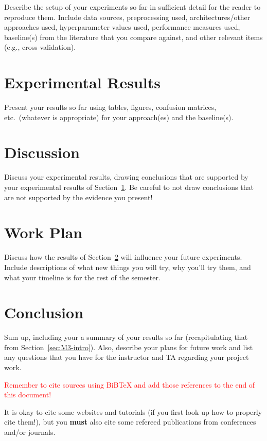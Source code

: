 \documentclass{report}
\begin{document}
Describe the setup of your experiments so far in sufficient detail for the reader to reproduce them.  Include data sources, preprocessing used, architectures/other approaches used, hyperparameter values used, performance measures used, baseline(s) from the literature that you compare against, and other relevant items (e.g., cross-validation).

\section{Experimental Results}
\label{sec:M3-results}

Present your results so far using tables, figures, confusion matrices, etc.\ (whatever is appropriate) for  your approach(es) and the baseline(s). 

\section{Discussion}
\label{sec:M3-discussion}

Discuss your experimental results, drawing conclusions that are supported by your experimental results of Section~\ref{sec:M3-results}.  Be careful to not draw conclusions that are not supported by the evidence you present! 


\section{Work Plan}

Discuss how the results of Section~\ref{sec:M3-discussion} will influence your future experiments.  Include descriptions of what new things you will try, why you'll try them, and what your timeline is for the rest of the semester. 

\section{Conclusion}

Sum up, including your a summary of your results so far (recapitulating that from Section~\ref{sec:M3-intro}).  Also, describe your plans for future work and list any questions that you have for the instructor and TA regarding your project work.

\textcolor{red}{Remember to cite sources using BiBTeX and add those references to the end of this document!}

It is okay to cite some websites and tutorials (if you first look up how to properly cite them!), but you {\bf must} also cite some refereed publications from conferences and/or journals.
\end{document}
